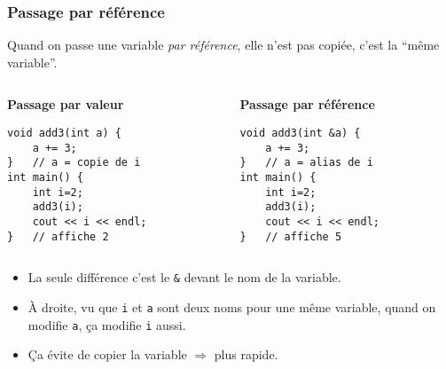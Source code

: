 \documentclass[12pt]{beamer}
\begin{document}
\begin{frame}[fragile]
\frametitle{Passage par référence}
Quand on passe une variable \emph{par référence}, elle n'est pas copiée, c'est la ``même variable''.
\vspace{3pt}
\begin{columns}[T]
\begin{column}{.45\textwidth}
\textbf{Passage par valeur}
\begin{lstlisting}
void add3(int a) {
    a += 3;
}   // a = copie de i
int main() {
    int i=2;
    add3(i);
    cout << i << endl;
}   // affiche 2
\end{lstlisting}
\end{column}
\begin{column}{.45\textwidth}
\textbf{Passage par référence}
\begin{lstlisting}
void add3(int &a) {
    a += 3;
}   // a = alias de i
int main() {
    int i=2;
    add3(i);
    cout << i << endl;
}   // affiche 5
\end{lstlisting}
\end{column}
\end{columns}
\vspace{3pt}
\begin{itemize}
\item La seule différence c'est le \lstinline|&| devant le nom de la variable.
\item À droite, vu que \lstinline|i| et \lstinline|a| sont deux noms pour une même variable, quand on modifie \lstinline|a|, ça modifie \lstinline|i| aussi.
\item Ça évite de copier la variable $\Rightarrow$ plus rapide.
\end{itemize}
\end{frame}
\end{document}
